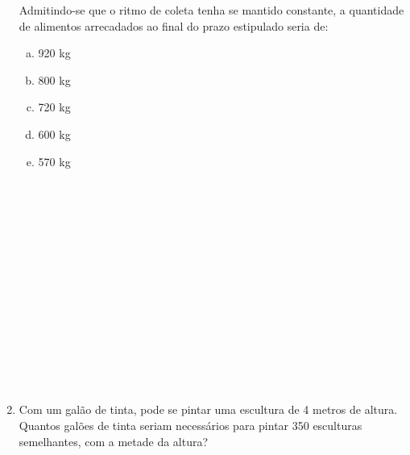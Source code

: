 \documentclass[a4paper,14pt]{article}
\begin{document}
\begin{multicols}{2}
\begin{enumerate}
	    	Admitindo-se que o ritmo de coleta tenha se mantido constante, a quantidade de alimentos arrecadados ao final do prazo estipulado seria de:
	    	 \begin{enumerate}[a)]
	    		\item 920 kg
	    		\item 800 kg
	    		\item 720 kg
	    		\item 600 kg
	    		\item 570 kg \\\\\\\\\\\\\\\\\\\\\\\\\\\\\\
	    	\end{enumerate}
    	    \item Com um galão de tinta, pode se pintar uma escultura de 4 metros de altura. Quantos galões de tinta seriam necessários para pintar 350 esculturas semelhantes, com a metade da altura? \\\\\\\\\\\\\\\\\\\\\\\\\\\\\\\\\\\\\\\\\\\\\\\\\\\\\\\\\\\\\\\\\\\\

\end{enumerate}
\end{multicols}
\end{document}
